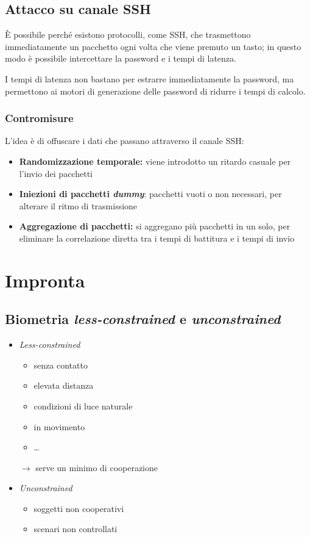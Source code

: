 \documentclass{report}
\begin{document}
\newpage
\section{Attacco su canale SSH}
È possibile perché esistono protocolli, come SSH, che trasmettono immediatamente 
un pacchetto ogni volta che viene premuto un tasto; in questo 
modo è possibile intercettare la password e i tempi di latenza.

\noindent I tempi di latenza non bastano per estrarre immediatamente
la password, ma permettono ai motori di generazione delle password
di ridurre i tempi di calcolo.

\subsection{Contromisure}
L'idea è di offuscare i dati che passano attraverso il canale SSH:
\begin{itemize}
    \item \textbf{Randomizzazione temporale:} viene introdotto un ritardo casuale per l'invio dei pacchetti 
    \item \textbf{Iniezioni di pacchetti \textit{dummy}}: pacchetti vuoti o non necessari, per alterare il ritmo di trasmissione 
    \item \textbf{Aggregazione di pacchetti:} si aggregano più pacchetti in un solo, per eliminare la correlazione diretta tra 
    i tempi di battitura e i tempi di invio
\end{itemize}

\chapter{Impronta}

\section{Biometria \textit{less-constrained} e \textit{unconstrained}}

\begin{itemize}
    \item \textit{Less-constrained}
    \begin{itemize}
        \item senza contatto
        \item elevata distanza
        \item condizioni di luce naturale
        \item in movimento
        \item \dots
    \end{itemize}
    $\rightarrow$ serve un minimo di cooperazione

    \item \textit{Unconstrained}
    \begin{itemize}
        \item soggetti non cooperativi
        \item scenari non controllati
    \end{itemize}
\end{itemize}
\end{document}
